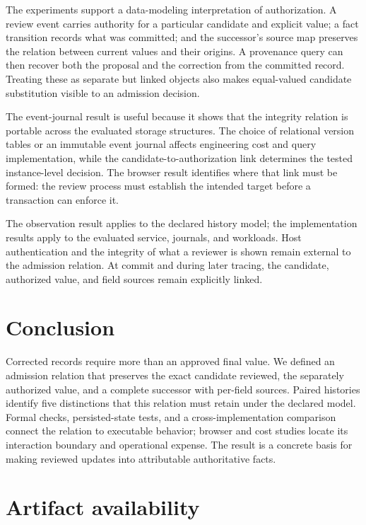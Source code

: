\documentclass[preprint,12pt,authoryear]{elsarticle}
\begin{document}
The experiments support a data-modeling interpretation of authorization. A review event carries authority for a particular candidate and explicit value; a fact transition records what was committed; and the successor's source map preserves the relation between current values and their origins. A provenance query can then recover both the proposal and the correction from the committed record. Treating these as separate but linked objects also makes equal-valued candidate substitution visible to an admission decision.

The event-journal result is useful because it shows that the integrity relation is portable across the evaluated storage structures. The choice of relational version tables or an immutable event journal affects engineering cost and query implementation, while the candidate-to-authorization link determines the tested instance-level decision. The browser result identifies where that link must be formed: the review process must establish the intended target before a transaction can enforce it.

The observation result applies to the declared history model; the implementation results apply to the evaluated service, journals, and workloads. Host authentication and the integrity of what a reviewer is shown remain external to the admission relation. At commit and during later tracing, the candidate, authorized value, and field sources remain explicitly linked.

\section{Conclusion}

Corrected records require more than an approved final value. We defined an admission relation that preserves the exact candidate reviewed, the separately authorized value, and a complete successor with per-field sources. Paired histories identify five distinctions that this relation must retain under the declared model. Formal checks, persisted-state tests, and a cross-implementation comparison connect the relation to executable behavior; browser and cost studies locate its interaction boundary and operational expense. The result is a concrete basis for making reviewed updates into attributable authoritative facts.

\section*{Artifact availability}
\end{document}
